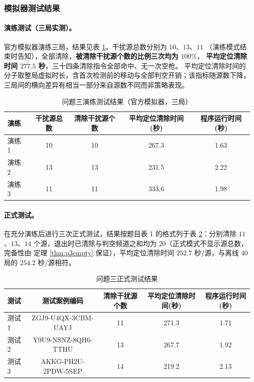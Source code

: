 \documentclass[withoutpreface, bwprint]{cumcmthesis}
\begin{document}
\subsubsection{模拟器测试结果}

\paragraph{演练测试（三局实测）。}
官方模拟器演练三局，结果见表 \ref{tab:p3drill}。干扰源总数分别为 $10$、$13$、$11$
（演练模式结束时告知），全部清除，\textbf{被清除干扰源个数的比例三次均为 $100\%$}，
\textbf{平均定位清除时间 $277.5$ 秒}，三十四条清除指令全部命中、无一次空枪。
平均定位清除时间的分子取整局虚拟时长，含首次检测前的移动与全部判空开销；该指标随源数下降，
三局间的横向差异有相当一部分来自源数不同而非策略表现。

\begin{table}[H]
  \centering
  \caption{问题三演练测试结果（官方模拟器，三局）}
  \label{tab:p3drill}
  \footnotesize
  \begin{tabular}{lcccc}
    \toprule
    演练 & 干扰源总数 & 清除干扰源个数 & 平均定位清除时间(秒) & 程序运行时间(秒) \\
    \midrule
    演练 1 & 10 & 10 & 267.3 & 1.63 \\
    演练 2 & 13 & 13 & 231.5 & 2.22 \\
    演练 3 & 11 & 11 & 333.6 & 1.98 \\
    \bottomrule
  \end{tabular}
\end{table}

\paragraph{正式测试。}
在充分演练后进行三次正式测试，结果按题目表 1 的格式列于表 \ref{tab:p3official}：分别清除
$11$、$13$、$14$ 个源，退出时已清除与判空频道之和均为 $20$（正式模式不显示源总数，完备性由
定理 \ref{thm:p3empty} 保证），平均定位清除时间 $252.7$ 秒/源，与离线 $40$ 局的 $254.2$ 秒/源相符。

\begin{table}[H]
  \centering
  \caption{问题三正式测试结果}
  \label{tab:p3official}
  \footnotesize
  \begin{tabular}{lcccc}
    \toprule
    测试 & 测试案例编码 & 清除干扰源个数 & 平均定位清除时间(秒) & 程序运行时间(秒) \\
    \midrule
    测试 1 & ZGJ9-U4QX-3CBM-UAYJ & 11 & 271.3 & 1.71 \\
    测试 2 & Y9U9-NSNZ-8QH6-TTHU & 13 & 267.7 & 1.92 \\
    测试 3 & AKKG-PH2U-2PDW-5SEP & 14 & 219.2 & 2.13 \\
    \bottomrule
  \end{tabular}
\end{table}
\end{document}
